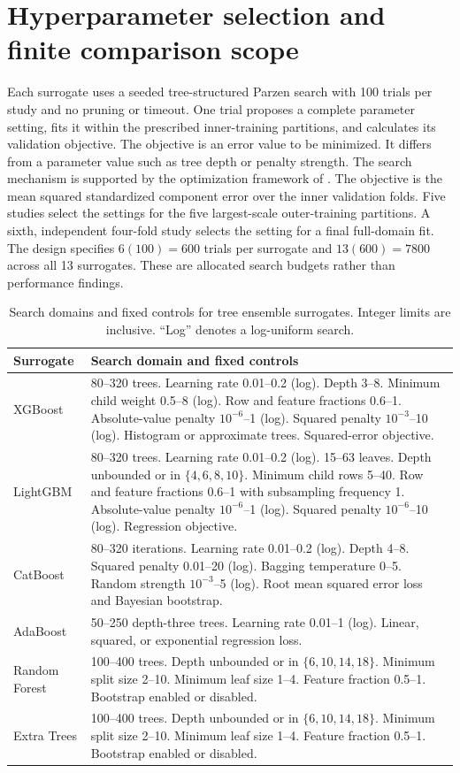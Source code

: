 \section{Hyperparameter selection and finite comparison scope}

Each surrogate uses a seeded tree-structured Parzen search with 100 trials per study and no pruning or timeout. One trial proposes a complete parameter setting, fits it within the prescribed inner-training partitions, and calculates its validation objective. The objective is an error value to be minimized. It differs from a parameter value such as tree depth or penalty strength. The search mechanism is supported by the optimization framework of \citet{Akiba2019}. The objective is the mean squared standardized component error over the inner validation folds. Five studies select the settings for the five largest-scale outer-training partitions. A sixth, independent four-fold study selects the setting for a final full-domain fit. The design specifies $6(100)=600$ trials per surrogate and $13(600)=7800$ across all 13 surrogates. These are allocated search budgets rather than performance findings.

\begin{table}[htbp]
\centering\small
\caption{Search domains and fixed controls for tree ensemble surrogates. Integer limits are inclusive. ``Log'' denotes a log-uniform search.}\label{tab:surrogate_search_domains}
\begin{tabular}{p{2.65cm}p{9.2cm}}
\toprule
Surrogate & Search domain and fixed controls\\
\midrule
XGBoost & 80--320 trees. Learning rate 0.01--0.2 (log). Depth 3--8. Minimum child weight 0.5--8 (log). Row and feature fractions 0.6--1. Absolute-value penalty $10^{-6}$--1 (log). Squared penalty $10^{-3}$--10 (log). Histogram or approximate trees. Squared-error objective.\\
LightGBM & 80--320 trees. Learning rate 0.01--0.2 (log). 15--63 leaves. Depth unbounded or in $\{4,6,8,10\}$. Minimum child rows 5--40. Row and feature fractions 0.6--1 with subsampling frequency 1. Absolute-value penalty $10^{-6}$--1 (log). Squared penalty $10^{-6}$--10 (log). Regression objective.\\
CatBoost & 80--320 iterations. Learning rate 0.01--0.2 (log). Depth 4--8. Squared penalty 0.01--20 (log). Bagging temperature 0--5. Random strength $10^{-3}$--5 (log). Root mean squared error loss and Bayesian bootstrap.\\
AdaBoost & 50--250 depth-three trees. Learning rate 0.01--1 (log). Linear, squared, or exponential regression loss.\\
Random Forest & 100--400 trees. Depth unbounded or in $\{6,10,14,18\}$. Minimum split size 2--10. Minimum leaf size 1--4. Feature fraction 0.5--1. Bootstrap enabled or disabled.\\
Extra Trees & 100--400 trees. Depth unbounded or in $\{6,10,14,18\}$. Minimum split size 2--10. Minimum leaf size 1--4. Feature fraction 0.5--1. Bootstrap enabled or disabled.\\
\bottomrule
\end{tabular}
\end{table}


